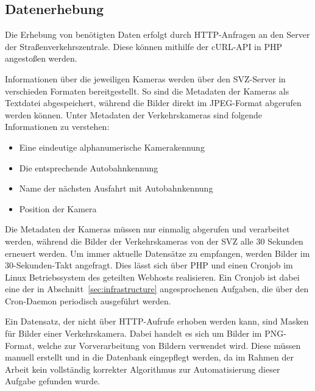 \subsection{Datenerhebung}
\label{sec:datenerhebung}
Die Erhebung von benötigten Daten erfolgt durch HTTP-Anfragen an den Server der Straßenverkehrszentrale. Diese können mithilfe der cURL-API in PHP angestoßen werden.

Informationen über die jeweiligen Kameras werden über den SVZ-Server in verschieden Formaten bereitgestellt. So sind die Metadaten der Kameras als Textdatei abgespeichert, während die Bilder direkt im JPEG-Format abgerufen werden können. Unter Metadaten der Verkehrskameras sind folgende Informationen zu verstehen: 
\begin{itemize}
\item{Eine eindeutige alphanumerische Kamerakennung}
\item{Die entsprechende Autobahnkennung}
\item{Name der nächsten Ausfahrt mit Autobahnkennung}
\item{Position der Kamera}
\end{itemize}
Die Metadaten der Kameras müssen nur einmalig abgerufen und verarbeitet werden, während die Bilder der Verkehrskameras von der SVZ alle 30 Sekunden erneuert werden. 
Um immer aktuelle Datensätze zu empfangen, werden Bilder im 30-Sekunden-Takt angefragt. 
Dies lässt sich über PHP und einen Cronjob im Linux Betriebssystem des geteilten Webhosts realisieren.
Ein Cronjob ist dabei eine der in Abschnitt~\ref{sec:infrastructure} angesprochenen Aufgaben, die über den Cron-Daemon periodisch ausgeführt werden.

Ein Datensatz, der nicht über HTTP-Aufrufe erhoben werden kann, sind Masken für Bilder einer Verkehrskamera.
Dabei handelt es sich um Bilder im PNG-Format, welche zur Vorverarbeitung von Bildern verwendet wird. Diese müssen manuell erstellt und in die Datenbank eingepflegt werden, da im Rahmen der Arbeit kein vollständig korrekter Algorithmus zur Automatisierung dieser Aufgabe gefunden wurde.
\newpage


